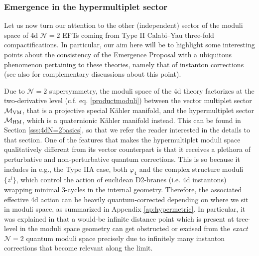 \subsubsection{Emergence in the hypermultiplet sector}
\label{ss:hypermultiplet4d}
		
Let us now turn our attention to the other (independent) sector of the moduli space of 4d $\mathcal{N}=2$ EFTs coming from Type II Calabi--Yau three-fold compactifications. In particular, our aim here will be to highlight some interesting points about the consistency of the Emergence Proposal with a ubiquitous phenomenon pertaining to these theories, namely that of instanton corrections (see also \cite{Hamada:2021yxy} for complementary discussions about this point).
		
Due to $\mathcal{N}=2$ supersymmetry, the moduli space of the 4d theory factorizes at the two-derivative level (c.f. eq. \eqref{productmoduli}) between the vector multiplet sector $\mathcal{M}_{\rm VM}$, that is a projective special K\"ahler manifold, and the hypermultiplet sector ${\cal M}_{\rm HM}$, which is a quaternionic K\"ahler manifold instead. This can be found in Section \ref{sss:4dN=2basics}, so that we refer the reader interested in the details to that section. %
One of the features that makes the hypermultiplet moduli space qualitatively different from its vector counterpart is that it receives a plethora of perturbative and non-perturbative quantum corrections. This is so because it includes in e.g., the Type IIA case, both $\varphi_4$ and the complex structure moduli $\{z^i\}$, which control the action of euclidean D2-branes (i.e. 4d instantons) wrapping minimal 3-cycles in the internal geometry. Therefore, the associated effective 4d action can be heavily quantum-corrected depending on where we sit in moduli space, as summarized in Appendix \ref{ap:hypermetric}. In particular, it was explained in \cite{Marchesano:2019ifh,Baume:2019sry} that a would-be infinite distance point which is present at tree-level in the moduli space geometry can get obstructed or excised from the \emph{exact} $\mathcal{N}=2$ quantum moduli space precisely due to infinitely many instanton corrections that become relevant along the limit.
		
